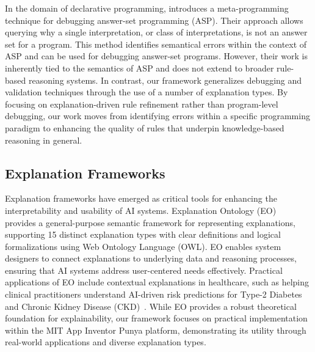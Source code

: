 In the domain of declarative programming, \citet{gebser2008meta} introduces a meta-programming technique for debugging answer-set programming (ASP). Their approach allows querying why a single interpretation, or class of interpretations, is not an answer set for a program.
This method identifies semantical errors within the context of ASP and can be used for debugging answer-set programs.
However, their work is inherently tied to the semantics of ASP and does not extend to broader rule-based reasoning systems. %
In contrast, our framework generalizes debugging and validation techniques through the use of a number of explanation types.
By focusing on explanation-driven rule refinement rather than program-level debugging, our work moves from identifying errors within a specific programming paradigm to enhancing the quality of rules that underpin knowledge-based reasoning in general. 

\subsection{Explanation Frameworks}

Explanation frameworks have emerged as critical tools for enhancing the interpretability and usability of AI systems. Explanation Ontology (EO)~\cite{chari2020explanation, chari2023explanation} provides a general-purpose semantic framework for representing explanations, supporting 15 distinct explanation types with clear definitions and logical formalizations using Web Ontology Language (OWL). EO enables system designers to connect explanations to underlying data and reasoning processes, ensuring that AI systems address user-centered needs effectively. Practical applications of EO include contextual explanations in healthcare, such as helping clinical practitioners understand AI-driven risk predictions for Type-2 Diabetes and Chronic Kidney Disease (CKD)~\cite{chari2023informing}. While EO provides a robust theoretical foundation for explainability, our framework focuses on practical implementation within the MIT App Inventor Punya platform, demonstrating its utility through real-world applications and diverse explanation types.


